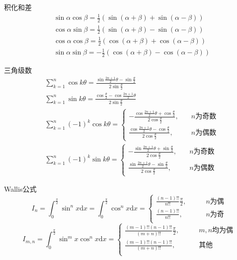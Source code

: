 \documentclass[lang = cn, scheme = chinese, thmcnt = section]{elegantbook}
\begin{document}
\begin{theorem}{积化和差}
	\begin{align*}
		&\sin\alpha\cos\beta=\frac{1}{2}(\sin(\alpha+\beta)+\sin(\alpha-\beta))\\
		&\cos\alpha\sin\beta=\frac{1}{2}(\sin(\alpha+\beta)-\sin(\alpha-\beta))\\
		&\cos\alpha\cos\beta=\frac{1}{2}(\cos(\alpha+\beta)+\cos(\alpha-\beta))\\
		&\sin\alpha\sin\beta=-\frac{1}{2}(\cos(\alpha+\beta)-\cos(\alpha-\beta))
	\end{align*}
\end{theorem}

\begin{theorem}{三角级数}
	\begin{align*}
		& \sum_{k=1}^{n}{\cos{k\theta}}=\frac{\sin{\frac{2n+1}{2}\theta}-\sin{\frac{\theta}{2}}}{2\sin{\frac{\theta}{2}}}\\
		& \sum_{k=1}^{n}{\sin{k\theta}}=\frac{\cos{\frac{\theta}{2}}-\cos{\frac{2n+1}{2}\theta}}{2\sin{\frac{\theta}{2}}}\\
		& \sum_{k=1}^{n}{(-1)^k \cos{k\theta}}=\begin{cases}
			\displaystyle-\frac{\cos{\frac{2n+1}{2}\theta}+\cos{\frac{\theta}{2}}}{2\cos{\frac{\theta}{2}}},\quad & n\text{为奇数}\\
			\displaystyle\frac{\cos{\frac{2n+1}{2}\theta}-\cos{\frac{\theta}{2}}}{2\cos{\frac{\theta}{2}}},\quad & n\text{为偶数}
		\end{cases}\\
		& \sum_{k=1}^{n}{(-1)^k \sin{k\theta}}=\begin{cases}
			\displaystyle-\frac{\sin{\frac{2n+1}{2}\theta}+\sin{\frac{\theta}{2}}}{2\cos{\frac{\theta}{2}}},\quad & n\text{为奇数}\\
			\displaystyle\frac{\sin{\frac{2n+1}{2}\theta}-\sin{\frac{\theta}{2}}}{2\cos{\frac{\theta}{2}}},\quad & n\text{为偶数}
		\end{cases}
	\end{align*}
\end{theorem}

\begin{theorem}{Wallis公式}
	$$
	I_n
	=\int_0^{\frac{\pi}{2}}\sin^nx\mathrm{d}x
	=\int_0^{\frac{\pi}{2}}\cos^nx\mathrm{d}x
	=\begin{cases}
		\displaystyle\frac{(n-1)!!}{n!!}\frac{\pi}{2},\qquad & n\text{为偶}\\
		\displaystyle\frac{(n-1)!!}{n!!},\qquad & n\text{为奇}\\
	\end{cases}
	$$
	$$
	I_{m,n}
	=\int_0^{\frac{\pi}{2}}\sin^mx\cos^nx\mathrm{d}x
	=\begin{cases}
		\displaystyle\frac{(m-1)!!(n-1)!!}{(m+n)!!}\frac{\pi}{2},\qquad & m,n\text{均为偶}\\
		\displaystyle\frac{(m-1)!!(n-1)!!}{(m+n)!!},\qquad & \text{其他}\\
	\end{cases}
	$$
\end{theorem}
\end{document}
